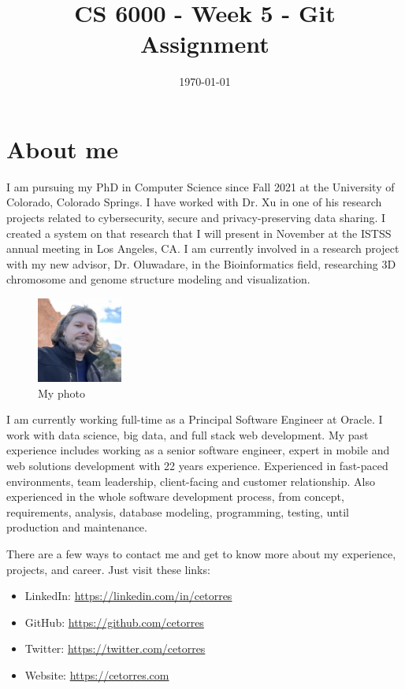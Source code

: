 \documentclass{article}
\title{CS 6000 - Week 5 - Git Assignment}
\author{\myfullname}
\date{\today}
\begin{document}
\maketitle

\section{About me}

I am pursuing my PhD in Computer Science since Fall 2021 at the University of Colorado, Colorado Springs. I have worked with Dr. Xu in one of his research projects related to cybersecurity, secure and privacy-preserving data sharing. I created a system on that research that I will present in November at the ISTSS annual meeting in Los Angeles, CA.
I am currently involved in a research project with my new advisor, Dr. Oluwadare, in the Bioinformatics field, researching 3D chromosome and genome structure modeling and visualization.

\begin{figure}
    \centering
    \includegraphics[width=0.25\textwidth]{Torres-F23-photo.jpg}
    \caption{\small My photo}
\end{figure}

I am currently working full-time as a Principal Software Engineer at Oracle. I work with data science, big data, and full stack web development. My past experience includes working as a senior software engineer, expert in mobile and web solutions development with 22 years experience. Experienced in fast-paced environments, team leadership, client-facing and customer relationship. Also experienced in the whole software development process, from concept, requirements, analysis, database modeling, programming, testing, until production and maintenance.

There are a few ways to contact me and get to know more about my experience, projects, and career. Just visit these links:
\begin{itemize}
    \item LinkedIn: \url{https://linkedin.com/in/cetorres}
    \item GitHub: \url{https://github.com/cetorres}
    \item Twitter: \url{https://twitter.com/cetorres}
    \item Website: \url{https://cetorres.com}
\end{itemize}
\end{document}
